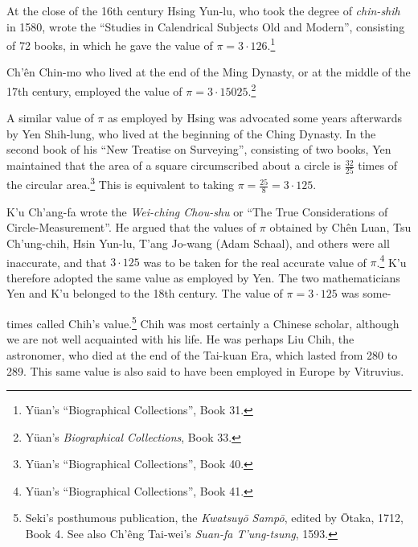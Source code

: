 \documentclass[11pt]{article}
\newcommand{\scanpage}[2]{\clearpage\setcounter{footnote}{0}\noindent{\footnotesize\color{gray}PDF page #1 · #2}\par\medskip}
\newcommand{\scanfooter}{}
\begin{document}
At the close of the 16th century Hsing Yun-lu, who took the degree of \emph{chin-shih} in 1580, wrote the ``Studies in Calendrical Subjects Old and Modern'', consisting of 72 books, in which he gave the value of $\pi=3\cdot126$.\footnote{Yüan's ``Biographical Collections'', Book 31.}

Ch'ên Chin-mo who lived at the end of the Ming Dynasty, or at the middle of the 17th century, employed the value of $\pi=3\cdot15025$.\footnote{Yüan's \emph{Biographical Collections}, Book 33.}

A similar value of $\pi$ as employed by Hsing was advocated some years afterwards by Yen Shih-lung, who lived at the beginning of the Ching Dynasty. In the second book of his ``New Treatise on Surveying'', consisting of two books, Yen maintained that the area of a square circumscribed about a circle is $\frac{32}{25}$ times of the circular area.\footnote{Yüan's ``Biographical Collections'', Book 40.} This is equivalent to taking $\pi=\frac{25}{8}=3\cdot125$.

K'u Ch'ang-fa wrote the \emph{Wei-ching Chou-shu} or ``The True Considerations of Circle-Measurement''. He argued that the values of $\pi$ obtained by Chên Luan, Tsu Ch'ung-chih, Hsin Yun-lu, T'ang Jo-wang (Adam Schaal), and others were all inaccurate, and that $3\cdot125$ was to be taken for the real accurate value of $\pi$.\footnote{Yüan's ``Biographical Collections'', Book 41.} K'u therefore adopted the same value as employed by Yen. The two mathematicians Yen and K'u belonged to the 18th century. The value of $\pi=3\cdot125$ was some-
\scanfooter

\scanpage{0153}{Chapter 20, printed page 139}
times called Chih's value.\footnote{Seki's posthumous publication, the \emph{Kwatsuyō Sampō}, edited by Ōtaka, 1712, Book 4. See also Ch'êng Tai-wei's \emph{Suan-fa T'ung-tsung}, 1593.} Chih was most certainly a Chinese scholar, although we are not well acquainted with his life. He was perhaps Liu Chih, the astronomer, who died at the end of the Tai-kuan Era, which lasted from 280 to 289. This same value is also said to have been employed in Europe by Vitruvius.
\end{document}
